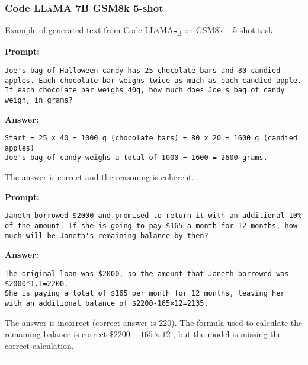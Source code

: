 \subsubsection*{Code \textsc{LLaMA} 7B GSM8k 5-shot}
\noindent Example of generated text from Code \textsc{LLaMA}\textsubscript{7B} on GSM8k -- 5-shot task:
\begin{displayquote}
	\textbf{Prompt:}
	\begin{Verbatim}[fontsize=\small,breaklines]
Joe's bag of Halloween candy has 25 chocolate bars and 80 candied apples. Each chocolate bar weighs twice as much as each candied apple. If each chocolate bar weighs 40g, how much does Joe's bag of candy weigh, in grams?
	\end{Verbatim}
	\textbf{Answer:}
	\begin{Verbatim}[fontsize=\small,breaklines]
Start = 25 x 40 = 1000 g (chocolate bars) + 80 x 20 = 1600 g (candied apples)
Joe's bag of candy weighs a total of 1000 + 1600 = 2600 grams.
	\end{Verbatim}
\end{displayquote}
The answer is correct and the reasoning is coherent.
\begin{displayquote}
	\textbf{Prompt:}
	\begin{Verbatim}[fontsize=\small,breaklines]
Janeth borrowed $2000 and promised to return it with an additional 10% of the amount. If she is going to pay $165 a month for 12 months, how much will be Janeth's remaining balance by then?
	\end{Verbatim}
	\textbf{Answer:}
	\begin{Verbatim}[fontsize=\small,breaklines]
The original loan was $2000, so the amount that Janeth borrowed was $2000*1.1=2200.
She is paying a total of $165 per month for 12 months, leaving her with an additional balance of $2200-165×12=2135.
	\end{Verbatim}
\end{displayquote}
The answer is incorrect (correct answer is 220).
The formula used to calculate the remaining balance is correct $\$2200-165\times12$ , but the model is missing the correct calculation.

	\noindent\rule{\textwidth}{0.4pt}

